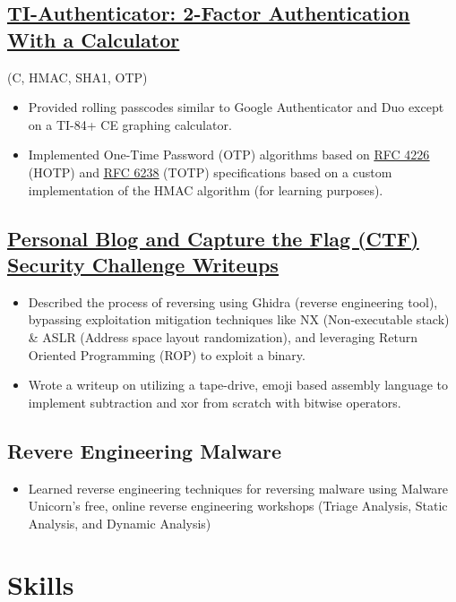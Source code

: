 \documentclass{article}
\begin{document}
\subsection{\href{https://github.com/jshin313/ti-authenticator}{\underline{TI-Authenticator: 2-Factor Authentication With a Calculator}}} \hfill (C, HMAC, SHA1, OTP)
\begin{itemize}
    \item Provided rolling passcodes similar to Google Authenticator and Duo except on a TI-84+ CE graphing calculator.
    \item Implemented One-Time Password (OTP) algorithms based on \href{https://tools.ietf.org/html/rfc4226}{\underline{RFC 4226}} (HOTP) and \href{https://tools.ietf.org/html/rfc6238}{\underline{RFC 6238}} (TOTP) specifications based on a custom implementation of the HMAC algorithm (for learning purposes).
\end{itemize}

\subsection{\href{https://jacobshin.com/posts/}{ \underline{Personal Blog and Capture the Flag (CTF) Security Challenge Writeups}}}
\begin{itemize}
    \item Described the process of reversing using Ghidra (reverse engineering tool), bypassing exploitation mitigation techniques like NX (Non-executable stack) \& ASLR (Address space layout randomization), and leveraging Return Oriented Programming (ROP) to exploit a binary.
    \item Wrote a writeup on utilizing a tape-drive, emoji based assembly language to implement subtraction and xor from scratch with bitwise operators.
\end{itemize}

\subsection{Revere Engineering Malware}
\begin{itemize}
    \item Learned reverse engineering techniques for reversing malware using Malware Unicorn's free, online reverse engineering workshops (Triage Analysis, Static Analysis, and Dynamic Analysis)
\end{itemize}

\section{Skills}
\end{document}
